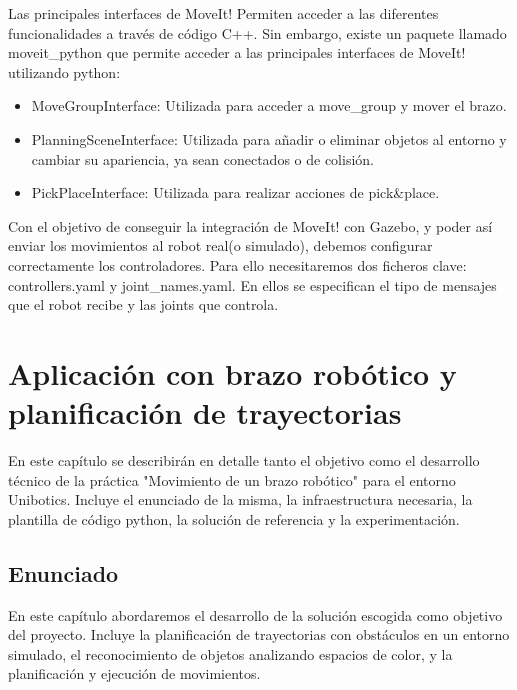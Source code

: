 \documentclass[12pt,spanish,chapterprefix, numbers=noenddot]{book}
\numberwithin{equation}{section}
\numberwithin{figure}{section}
\begin{document}
Las principales interfaces de MoveIt! Permiten acceder a las diferentes funcionalidades a través de código C++. Sin embargo, existe un paquete llamado moveit\_python que permite acceder a las principales interfaces de MoveIt! utilizando python:
\begin{itemize}
\item MoveGroupInterface: Utilizada para acceder a move\_group y mover el brazo. 
\item PlanningSceneInterface: Utilizada para añadir o eliminar objetos al entorno y cambiar su apariencia, ya sean conectados o de colisión. 
\item PickPlaceInterface: Utilizada para realizar acciones de pick\&place.
\end{itemize}

Con el objetivo de conseguir la integración de MoveIt! con Gazebo, y poder así enviar los movimientos al robot real(o simulado), debemos configurar correctamente los controladores. Para ello necesitaremos dos ficheros clave: controllers.yaml y joint\_names.yaml.  En ellos se especifican el tipo de mensajes que el robot recibe y las joints que controla.  

\chapter{Aplicación con brazo robótico y planificación de trayectorias}
En este capítulo se describirán en detalle tanto el objetivo como el desarrollo técnico de la práctica "Movimiento de un brazo robótico" para el entorno Unibotics. 
Incluye el enunciado de la misma, la infraestructura necesaria, la plantilla de código python, la solución de referencia y la experimentación. 

\section{Enunciado}

En este capítulo abordaremos el desarrollo de la solución escogida como objetivo del proyecto. Incluye la planificación de trayectorias con obstáculos en un entorno simulado, el reconocimiento de objetos analizando espacios de color, y la planificación y ejecución de movimientos. 
\end{document}
